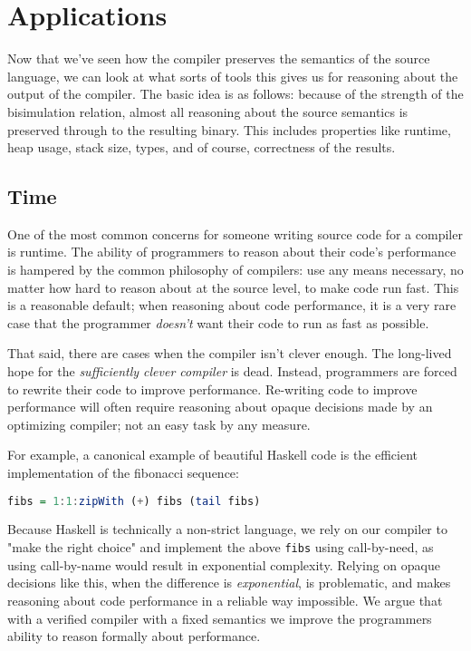 \section{Applications}

Now that we've seen how the compiler preserves the semantics of the source
language, we can look at what sorts of tools this gives us for reasoning about
the output of the compiler. The basic idea is as follows: because of the
strength of the bisimulation relation, almost all reasoning about the source
semantics is preserved through to the resulting binary. This includes properties
like runtime, heap usage, stack size, types, and of course, correctness of
the results.

\subsection{Time}

One of the most common concerns for someone writing source code for a compiler
is runtime. The ability of programmers to reason about their code's performance
is hampered by the common philosophy of compilers: use any means necessary, no
matter how hard to reason about at the source level, to make code run fast. This
is a reasonable default; when reasoning about code performance, it is a very
rare case that the programmer \emph{doesn't} want their code to run as fast as
possible. 

That said, there are cases when the compiler isn't clever enough. The long-lived
hope for the \emph{sufficiently clever compiler} is dead. Instead, programmers
are forced to rewrite their code to improve performance. Re-writing code to
improve performance will often require reasoning about opaque decisions made by
an optimizing compiler; not an easy task by any measure.

For example, a canonical example of beautiful Haskell code is the efficient
implementation of the fibonacci sequence: 

\begin{lstlisting}[language=Haskell]
fibs = 1:1:zipWith (+) fibs (tail fibs)
\end{lstlisting}

Because Haskell is technically a non-strict language, we rely on our compiler to
"make the right choice" and implement the above \texttt{fibs} using
call-by-need, as using call-by-name would result in exponential complexity.
Relying on opaque decisions like this, when the difference is
\emph{exponential}, is problematic, and makes reasoning about code performance
in a reliable way impossible. We argue that with a verified compiler with a
fixed semantics we improve the programmers ability to reason formally about
performance. 

